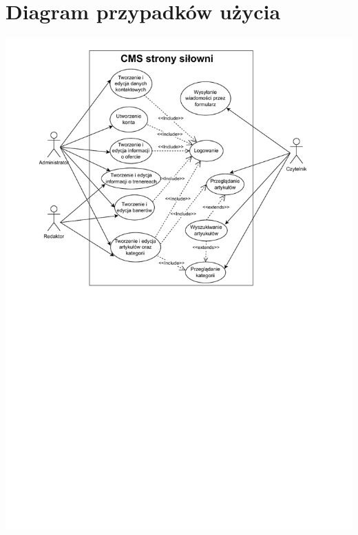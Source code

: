 \documentclass[12pt]{article}
\begin{document}
\section{Diagram przypadków użycia}
\includegraphics[width=1\textwidth, angle=0]{images/Przypadki_uzycia.pdf}
\end{document}
